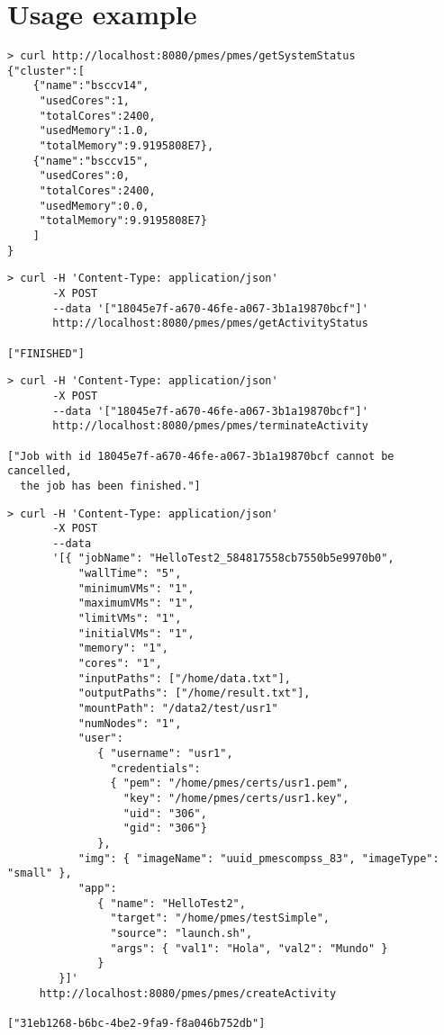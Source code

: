\documentclass[a4paper,10pt]{article}
\begin{document}
\section{Usage example}


\begin{lstlisting}[caption=getSystemStatus]
> curl http://localhost:8080/pmes/pmes/getSystemStatus
{"cluster":[
    {"name":"bsccv14",
     "usedCores":1,
     "totalCores":2400,
     "usedMemory":1.0,
     "totalMemory":9.9195808E7},
    {"name":"bsccv15",
     "usedCores":0,
     "totalCores":2400,
     "usedMemory":0.0,
     "totalMemory":9.9195808E7}
    ]
}
\end{lstlisting}

\begin{lstlisting}[caption=getActivityStatus]
> curl -H 'Content-Type: application/json' 
       -X POST 
       --data '["18045e7f-a670-46fe-a067-3b1a19870bcf"]'
       http://localhost:8080/pmes/pmes/getActivityStatus

["FINISHED"]
\end{lstlisting}

\begin{lstlisting}[caption=terminateActivity]
> curl -H 'Content-Type: application/json'
       -X POST
       --data '["18045e7f-a670-46fe-a067-3b1a19870bcf"]'
       http://localhost:8080/pmes/pmes/terminateActivity

["Job with id 18045e7f-a670-46fe-a067-3b1a19870bcf cannot be cancelled,
  the job has been finished."]
\end{lstlisting}


\begin{lstlisting}[caption=createActivity]
> curl -H 'Content-Type: application/json'
       -X POST
       --data 
       '[{ "jobName": "HelloTest2_584817558cb7550b5e9970b0",
           "wallTime": "5",
           "minimumVMs": "1",
           "maximumVMs": "1",
           "limitVMs": "1",
           "initialVMs": "1",
           "memory": "1",
           "cores": "1",
           "inputPaths": ["/home/data.txt"],
           "outputPaths": ["/home/result.txt"],
           "mountPath": "/data2/test/usr1"
           "numNodes": "1",
           "user": 
              { "username": "usr1",
                "credentials": 
                { "pem": "/home/pmes/certs/usr1.pem",
                  "key": "/home/pmes/certs/usr1.key",
                  "uid": "306",
                  "gid": "306"} 
              },
           "img": { "imageName": "uuid_pmescompss_83", "imageType": "small" },
           "app": 
              { "name": "HelloTest2",
                "target": "/home/pmes/testSimple",
                "source": "launch.sh",
                "args": { "val1": "Hola", "val2": "Mundo" } 
              } 
        }]'
     http://localhost:8080/pmes/pmes/createActivity

["31eb1268-b6bc-4be2-9fa9-f8a046b752db"]
\end{lstlisting}
\end{document}
